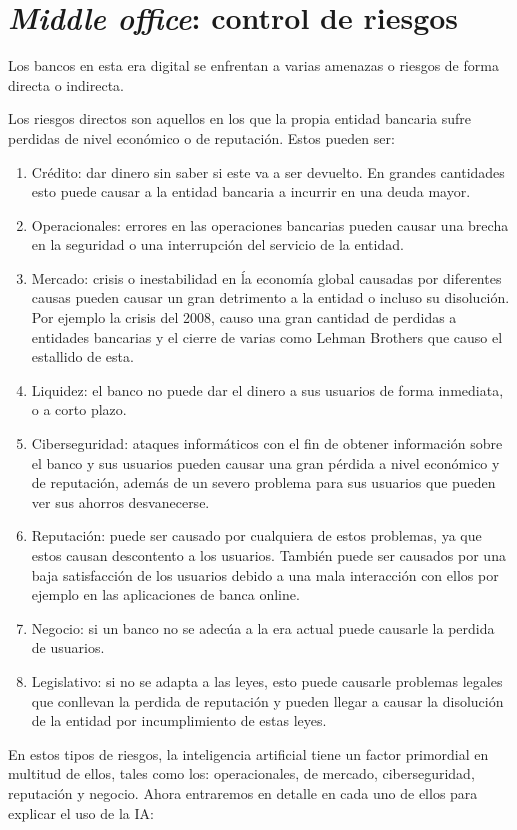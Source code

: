 \documentclass[12pt, a4paper]{report}
\begin{document}
\chapter{\textit{Middle office}: control de riesgos}
Los bancos en esta era digital se enfrentan a varias amenazas o riesgos de forma directa o indirecta.

Los riesgos directos son aquellos en los que la propia entidad bancaria sufre perdidas de nivel económico o de reputación. Estos pueden ser:
\begin{enumerate}
	\item Crédito: dar dinero sin saber si este va a ser devuelto. En grandes cantidades esto puede causar a la entidad bancaria a incurrir en una deuda mayor.
	\item Operacionales: errores en las operaciones bancarias pueden causar una brecha en la seguridad o una interrupción del servicio de la entidad.
	\item Mercado: crisis o inestabilidad en ĺa economía global causadas por diferentes causas pueden causar un gran detrimento a la entidad o incluso su disolución. Por ejemplo la crisis del 2008, causo una gran cantidad de perdidas a entidades bancarias y el cierre de varias como Lehman Brothers que causo el estallido de esta.
	\item Liquidez: el banco no puede dar el dinero a sus usuarios de forma inmediata, o a corto plazo.
	\item Ciberseguridad: ataques informáticos con el fin de obtener información sobre el banco y sus usuarios pueden causar una gran pérdida a nivel económico y de reputación, además de un severo problema para sus usuarios que pueden ver sus ahorros desvanecerse.
	\item Reputación: puede ser causado por cualquiera de estos problemas, ya que estos causan descontento a los usuarios. También puede ser causados por una baja satisfacción de los usuarios debido a una mala interacción con ellos por ejemplo en las aplicaciones de banca online. 
	\item Negocio: si un banco no se adecúa a la era actual puede causarle la perdida de usuarios.
	\item Legislativo: si no se adapta a las leyes, esto puede causarle problemas legales que conllevan la perdida de reputación y pueden llegar a causar la disolución de la entidad por incumplimiento de estas leyes.
\end{enumerate}

En estos tipos de riesgos, la inteligencia artificial tiene un factor primordial en multitud de ellos, tales como los: operacionales, de mercado, ciberseguridad, reputación y negocio.
\newline
\newline
Ahora entraremos en detalle en cada uno de ellos para explicar el uso de la IA:
\end{document}
